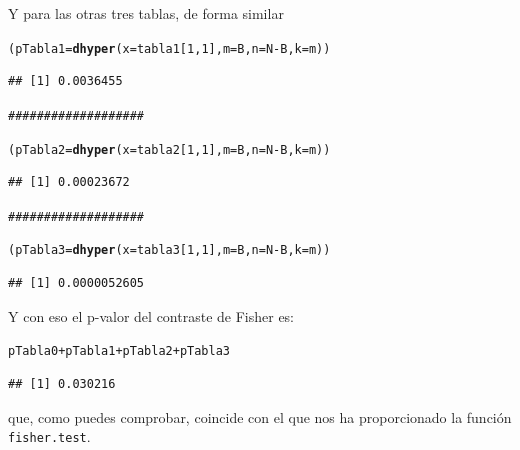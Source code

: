 \documentclass[10pt,a4paper]{article}\usepackage[]{graphicx}\usepackage[]{color}
\makeatletter
\newcommand{\hlnum}[1]{\textcolor[rgb]{0.686,0.059,0.569}{#1}}%
\newcommand{\hlcom}[1]{\textcolor[rgb]{0.678,0.584,0.686}{\textit{#1}}}%
\newcommand{\hlopt}[1]{\textcolor[rgb]{0,0,0}{#1}}%
\newcommand{\hlstd}[1]{\textcolor[rgb]{0.345,0.345,0.345}{#1}}%
\newcommand{\hlkwb}[1]{\textcolor[rgb]{0.69,0.353,0.396}{#1}}%
\newcommand{\hlkwc}[1]{\textcolor[rgb]{0.333,0.667,0.333}{#1}}%
\newcommand{\hlkwd}[1]{\textcolor[rgb]{0.737,0.353,0.396}{\textbf{#1}}}%
\newenvironment{kframe}{%
 \def\at@end@of@kframe{}%
 \ifinner\ifhmode%
  \def\at@end@of@kframe{\end{minipage}}%
  \begin{minipage}{\columnwidth}%
 \fi\fi%
 \def\FrameCommand##1{\hskip\@totalleftmargin \hskip-\fboxsep
 \colorbox{shadecolor}{##1}\hskip-\fboxsep
     \hskip-\linewidth \hskip-\@totalleftmargin \hskip\columnwidth}%
 \MakeFramed {\advance\hsize-\width
   \@totalleftmargin\z@ \linewidth\hsize
   \@setminipage}}%
 {\par\unskip\endMakeFramed%
 \at@end@of@kframe}
\newenvironment{knitrout}{}{} %
\newcounter {cont01}
\makeatother
\begin{document}
Y para las otras tres tablas, de forma similar
\begin{knitrout}
\color{fgcolor}\begin{kframe}
\begin{alltt}
\hlstd{(pTabla1} \hlkwb{=} \hlkwd{dhyper}\hlstd{(}\hlkwc{x}\hlstd{=tabla1[}\hlnum{1}\hlstd{,}\hlnum{1}\hlstd{],} \hlkwc{m} \hlstd{= B,} \hlkwc{n} \hlstd{= N} \hlopt{-} \hlstd{B,} \hlkwc{k} \hlstd{= m))}
\end{alltt}
\begin{verbatim}
## [1] 0.0036455
\end{verbatim}
\begin{alltt}
\hlcom{###################}

\hlstd{(pTabla2} \hlkwb{=} \hlkwd{dhyper}\hlstd{(}\hlkwc{x}\hlstd{=tabla2[}\hlnum{1}\hlstd{,}\hlnum{1}\hlstd{],} \hlkwc{m} \hlstd{= B,} \hlkwc{n} \hlstd{= N} \hlopt{-} \hlstd{B,} \hlkwc{k} \hlstd{= m))}
\end{alltt}
\begin{verbatim}
## [1] 0.00023672
\end{verbatim}
\begin{alltt}
\hlcom{###################}

\hlstd{(pTabla3} \hlkwb{=} \hlkwd{dhyper}\hlstd{(}\hlkwc{x}\hlstd{=tabla3[}\hlnum{1}\hlstd{,}\hlnum{1}\hlstd{],} \hlkwc{m} \hlstd{= B,} \hlkwc{n} \hlstd{= N} \hlopt{-} \hlstd{B,} \hlkwc{k} \hlstd{= m))}
\end{alltt}
\begin{verbatim}
## [1] 0.0000052605
\end{verbatim}
\end{kframe}
\end{knitrout}

Y con eso el p-valor del contraste de Fisher es:
\begin{knitrout}
\color{fgcolor}\begin{kframe}
\begin{alltt}
\hlstd{pTabla0} \hlopt{+} \hlstd{pTabla1} \hlopt{+} \hlstd{pTabla2} \hlopt{+} \hlstd{pTabla3}
\end{alltt}
\begin{verbatim}
## [1] 0.030216
\end{verbatim}
\end{kframe}
\end{knitrout}
que, como puedes comprobar, coincide con el que nos ha proporcionado la función {\tt fisher.test}.
\end{document}
